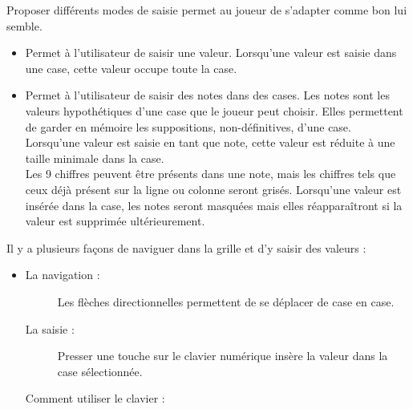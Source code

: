 \wPt\hspace{0.02cm}
{
    Proposer différents modes de saisie permet au joueur de s'adapter comme bon lui semble.
    \begin{itemize}
        \item {}
            {Permet à l'utilisateur de saisir une valeur.}
            {
                Lorsqu'une valeur est saisie dans une case, cette valeur occupe toute la case.
            }
        \item {}
            {Permet à l'utilisateur de saisir des notes dans des cases.}
            {
                Les notes sont les valeurs hypothétiques d'une case que le joueur peut choisir. Elles permettent de garder en mémoire les suppositions, non-définitives, d'une case.\\
                Lorsqu'une valeur est saisie en tant que note, cette valeur est réduite à une taille minimale dans la case.\\
                Les 9 chiffres peuvent être présents dans une note, mais les chiffres tels que ceux déjà présent sur la ligne ou colonne seront grisés.
                Lorsqu'une valeur est insérée dans la case, les notes seront masquées mais elles réapparaîtront si la valeur est supprimée ultérieurement.
            }
    \end{itemize}
    Il y a plusieurs façons de naviguer dans la grille et d'y saisir des valeurs :
    \begin{itemize}
        \item {}
            {
                \begin{description}
                    \item[La navigation :] Les flèches directionnelles permettent de se déplacer de case en case.
                    \item[La saisie :] Presser une touche sur le clavier numérique insère la valeur dans la case sélectionnée.
                \end{description}
            }
            {
                Comment utiliser le clavier :
                \noexpand{}}
\end{itemize}}
